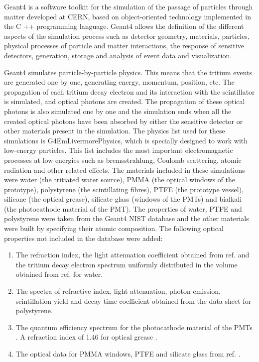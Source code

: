 Geant4 is a software toolkit for the simulation of the passage of particles through matter developed at CERN, based on object-oriented technology implemented in the C ++ programming language. Geant4 allows the definition of the different aspects of the simulation process such as detector geometry, materials, particles, physical processes of particle and matter interactions, the response of sensitive detectors, generation, storage and analysis of event data and visualization.

Geant4 simulates particle-by-particle physics. This means that the tritium events are generated one by one, generating energy, momentum, position, etc. The propagation of each tritium decay electron and its interaction  with the scintillator is simulated, and optical photons are created. The propagation of these optical photons is also simulated one by one and the simulation ends when all the created optical photons have been absorbed by either the sensitive detector or other materials present in the simulation. The physics list used for these simulations is G4EmLivermorePhysics, which is specially designed to work with low-energy particles. This list includes the most important electromagnetic processes at low energies such as bremsstrahlung, Coulomb scattering, atomic radiation and other related effects. The materials included in these simulations were water (the tritiated water source), PMMA (the optical windows of the prototype), polystyrene (the scintillating fibres), PTFE (the prototype vessel), silicone (the optical grease), silicate glass (windows of the PMTs) and bialkali (the photocathode material of the PMT). The properties of water, PTFE and polystyrene were taken from the Geant4 NIST database and the other materials were built by specifying their atomic composition. The following optical properties not included in the database were added:

\begin{enumerate}
%
\item{} The refraction index, the light attenuation coefficient obtained from ref. \cite{WaterPropertiesSimulation} and the tritium decay electron spectrum uniformly distributed in the volume obtained from ref. \cite{TritiumEmissionSpectrum} for water. 

\item{} The spectra of refractive index, light attenuation, photon emission, scintillation yield and decay time coefficient obtained from the data sheet \cite{DataSheetBCF12Fiber} for polystyrene.

\item{} The quantum efficiency spectrum for the photocathode material of the PMTs \cite{DataSheetPMTs}. A refraction index of 1.46 for optical grease \cite{OpticalGrease}.

\item{} The optical data for PMMA windows, PTFE and silicate glass from ref. \cite{NEMODataSimulation}.

\end{enumerate} 
